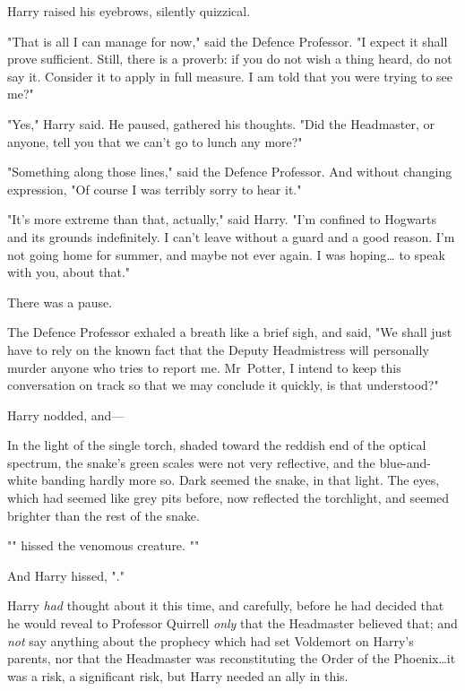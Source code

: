 Harry raised his eyebrows, silently quizzical.

"That is all I can manage for now," said the Defence Professor. "I expect it
shall prove sufficient. Still, there is a proverb: if you do not wish a thing
heard, do not say it. Consider it to apply in full measure. I am told that you
were trying to see me?"

"Yes," Harry said. He paused, gathered his thoughts. "Did the Headmaster, or
anyone, tell you that we can’t go to lunch any more?"

"Something along those lines," said the Defence Professor. And without changing
expression, "Of course I was terribly sorry to hear it."

"It’s more extreme than that, actually," said Harry. "I’m confined to Hogwarts
and its grounds indefinitely. I can’t leave without a guard and a good reason.
I’m not going home for summer, and maybe not ever again. I was hoping…
to speak with you, about that."

There was a pause.

The Defence Professor exhaled a breath like a brief sigh, and said, "We shall
just have to rely on the known fact that the Deputy Headmistress will
personally murder anyone who tries to report me. Mr~Potter, I intend to keep
this conversation on track so that we may conclude it quickly, is that
understood?"

Harry nodded, and—

In the light of the single torch, shaded toward the reddish end of the optical
spectrum, the snake’s green scales were not very reflective, and the
blue-and-white banding hardly more so. Dark seemed the snake, in that light.
The eyes, which had seemed like grey pits before, now reflected the torchlight,
and seemed brighter than the rest of the snake.

"" hissed the venomous creature. ""

And Harry hissed, "."

Harry \emph{had} thought about it this time, and carefully, before he had
decided that he would reveal to Professor Quirrell \emph{only} that the
Headmaster believed that; and \emph{not} say anything about the prophecy which
had set Voldemort on Harry’s parents, nor that the Headmaster was
reconstituting the Order of the Phoenix…it was a risk, a significant
risk, but Harry needed an ally in this.

